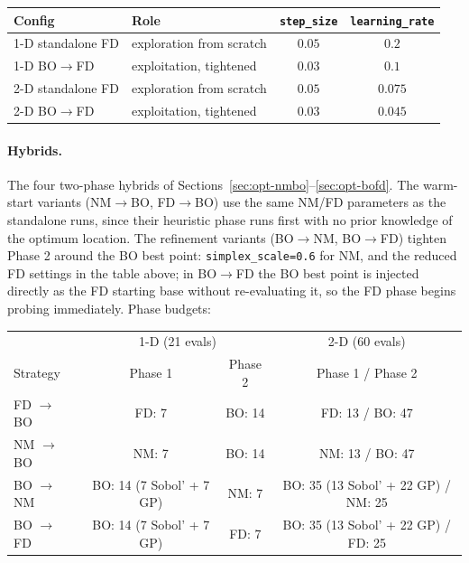 \begin{center}
\begin{tabular}{@{}llcc@{}}
\toprule
Config & Role & \texttt{step\_size} & \texttt{learning\_rate} \\
\midrule
1-D standalone FD & exploration from scratch & $0.05$ & $0.2$ \\
1-D BO$\to$FD     & exploitation, tightened  & $0.03$ & $0.1$ \\
2-D standalone FD & exploration from scratch & $0.05$ & $0.075$ \\
2-D BO$\to$FD     & exploitation, tightened  & $0.03$ & $0.045$ \\
\bottomrule
\end{tabular}
\end{center}

\paragraph{Hybrids.} The four two-phase hybrids of
Sections~\ref{sec:opt-nmbo}--\ref{sec:opt-bofd}.  The warm-start variants
(NM$\to$BO, FD$\to$BO) use the same NM/FD parameters as the standalone runs,
since their heuristic phase runs first with no prior knowledge of the
optimum location.  The refinement variants (BO$\to$NM, BO$\to$FD) tighten
Phase 2 around the BO best point: \texttt{simplex\_scale=0.6} for NM, and
the reduced FD settings in the table above; in BO$\to$FD the BO best point
is injected directly as the FD starting base without re-evaluating it, so
the FD phase begins probing immediately.  Phase budgets:

\begin{center}
\begin{tabular}{@{}lccc@{}}
\toprule
& \multicolumn{2}{c}{1-D (21 evals)} & 2-D (60 evals) \\
Strategy & Phase 1 & Phase 2 & Phase 1 / Phase 2 \\
\midrule
FD $\to$ BO  & FD: 7           & BO: 14 & FD: 13 / BO: 47 \\
NM $\to$ BO  & NM: 7           & BO: 14 & NM: 13 / BO: 47 \\
BO $\to$ NM  & BO: 14 (7 Sobol' + 7 GP) & NM: 7 & BO: 35 (13 Sobol' + 22 GP) / NM: 25 \\
BO $\to$ FD  & BO: 14 (7 Sobol' + 7 GP) & FD: 7 & BO: 35 (13 Sobol' + 22 GP) / FD: 25 \\
\bottomrule
\end{tabular}
\end{center}

